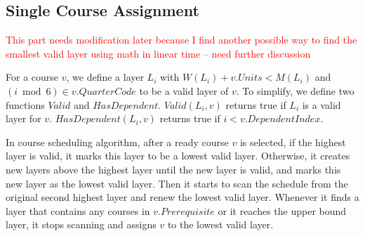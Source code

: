 \documentclass[letterpaper,12pt]{article}
\theoremstyle{definition}
\begin{document}

\subsection{Single Course Assignment}
\textcolor{red}{This part needs modification later because I find another possible way to find the smallest valid layer using math in linear time -- need further discussion}

For a course $v$, we define a layer $L_i$ with $W(L_i) + v.Units < M(L_i)$ and $(i \bmod 6)\in v.QuarterCode$ to be a valid layer of $v$. To simplify, we define two functions $Valid$ and $HasDependent$. $Valid(L_i,v)$ returns true if $L_i$ is a valid layer for $v$. $HasDependent(L_i,v)$ returns true if $i<v.DependentIndex$.

In course scheduling algorithm, after a ready course $v$ is selected, if the highest layer is valid, it marks this layer to be a lowest valid layer. Otherwise, it creates new layers above the highest layer until the new layer is valid, and marks this new layer as the lowest valid layer. Then it starts to scan the schedule from the original second highest layer and renew the lowest valid layer. Whenever it finds a layer that contains any courses in $v.Prerequisite$ or it reaches the upper bound layer, it stops scanning and assigns $v$ to the lowest valid layer.
\end{document}
